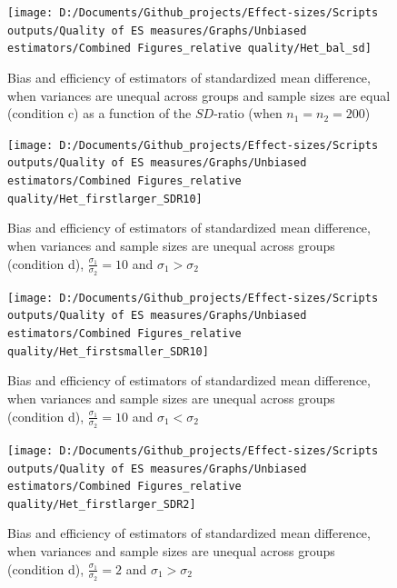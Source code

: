 \documentclass[
  english,
  man,floatsintext]{apa6}
\begin{document}
\begin{figure}

{\centering \texttt{[image: D:/Documents/Github\_projects/Effect-sizes/Scripts outputs/Quality of ES measures/Graphs/Unbiased estimators/Combined Figures\_relative quality/Het\_bal\_sd]} 

}

\caption{Bias and efficiency of estimators of standardized mean difference, when variances are unequal across groups and sample sizes are equal (condition c) as a function of the $SD$-ratio (when $n_1=n_2=200$)}\label{fig:idHetbal2}
\end{figure}

\begin{figure}

{\centering \texttt{[image: D:/Documents/Github\_projects/Effect-sizes/Scripts outputs/Quality of ES measures/Graphs/Unbiased estimators/Combined Figures\_relative quality/Het\_firstlarger\_SDR10]} 

}

\caption{Bias and efficiency of estimators of standardized mean difference, when variances and sample sizes are unequal across groups (condition d), $\frac{\sigma_1}{\sigma_2}=10$ and $\sigma_1>\sigma_2$}\label{fig:idHetunbal1}
\end{figure}

\begin{figure}

{\centering \texttt{[image: D:/Documents/Github\_projects/Effect-sizes/Scripts outputs/Quality of ES measures/Graphs/Unbiased estimators/Combined Figures\_relative quality/Het\_firstsmaller\_SDR10]} 

}

\caption{Bias and efficiency of estimators of standardized mean difference, when variances and sample sizes are unequal across groups (condition d), $\frac{\sigma_1}{\sigma_2}=10$ and $\sigma_1<\sigma_2$}\label{fig:idHetunbal2}
\end{figure}

\begin{figure}

{\centering \texttt{[image: D:/Documents/Github\_projects/Effect-sizes/Scripts outputs/Quality of ES measures/Graphs/Unbiased estimators/Combined Figures\_relative quality/Het\_firstlarger\_SDR2]} 

}

\caption{Bias and efficiency of estimators of standardized mean difference, when variances and sample sizes are unequal across groups (condition d), $\frac{\sigma_1}{\sigma_2}=2$ and $\sigma_1>\sigma_2$}\label{fig:idHetunbal3}
\end{figure}
\end{document}
